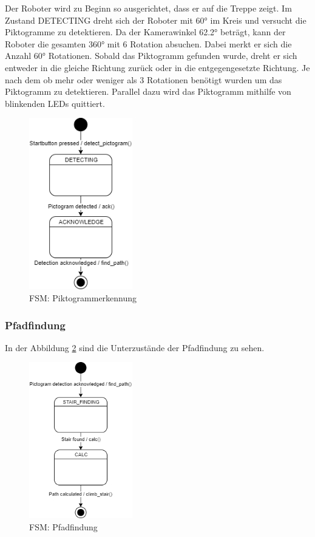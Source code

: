 Der Roboter wird zu Beginn so ausgerichtet, dass er auf die Treppe zeigt. Im Zustand DETECTING dreht sich der Roboter mit 60° im Kreis und versucht die Piktogramme zu detektieren. Da der Kamerawinkel 62.2° beträgt, kann der Roboter die gesamten 360° mit 6 Rotation absuchen. Dabei merkt er sich die Anzahl 60° Rotationen. Sobald das Piktogramm gefunden wurde, dreht er sich entweder in die gleiche Richtung zurück oder in die entgegengesetzte Richtung. Je nach dem ob mehr oder weniger als 3 Rotationen benötigt wurden um das Piktogramm zu detektieren. Parallel dazu wird das Piktogramm mithilfe von blinkenden LEDs quittiert.

\begin{figure}[H]
  \includegraphics[width=0.40\textwidth]{img/softwarearchitektur/FSM-PICTOGRAM_DETECTION.png}
  \centering
  \caption{FSM: Piktogrammerkennung}
  \label{fig:fsm-pictogrammdetection}
\end{figure}

\subsubsection{Pfadfindung}
In der Abbildung \ref{fig:fsm-pathfinding} sind die Unterzustände der Pfadfindung zu sehen. 
\begin{figure}[H]
  \includegraphics[width=0.40\textwidth]{img/softwarearchitektur/FSM-PATH_FINDING.png}
  \centering
  \caption{FSM: Pfadfindung}
  \label{fig:fsm-pathfinding}
\end{figure}

